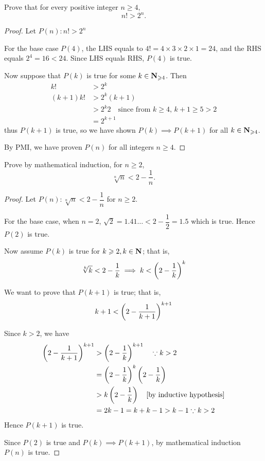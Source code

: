 \begin{prbm}
Prove that for every positive integer $n\ge4$,
\[ n!>2^n. \]
\end{prbm}

\begin{proof}
Let $P(n):n!>2^n$

For the base case $P(4)$, the LHS equals to $4!=4\times3\times2\times1=24$, and the RHS equals $2^4=16<24$. Since LHS equals RHS, $P(4)$ is true.

Now suppose that $P(k)$ is true for some $k\in\mathbf N_{\geqslant4}$. Then
\begin{align*}
k!&>2^k \\
(k+1)k!&>2^k(k+1)\\
&>2^k2\quad\text{since from $k\ge4$, $k+1\ge5>2$} \\
&=2^{k+1}
\end{align*}
thus $P(k+1)$ is true, so we have shown $P(k)\implies P(k+1)$ for all $k\in\mathbf N_{\geqslant4}$.

By PMI, we have proven $P(n)$ for all integers $n\ge4$.
\end{proof}

\begin{prbm}
Prove by mathematical induction, for $n\ge2$,
\[ \sqrt[n]{n}<2-\frac{1}{n}. \]
\end{prbm}

\begin{proof}
Let $P(n):\sqrt[n]{n}<2 - \dfrac{1}{n}$ for $n \ge 2$.

For the base case, when $n=2$, $\sqrt{2}=1.41\dots<2-\dfrac{1}{2}=1.5$ which is true. Hence $P(2)$ is true.

Now assume $P(k)$ is true for $k \geqslant 2, k \in \mathbf N$; that is,
\[ \sqrt[k]{k}<2 - \dfrac{1}{k} \implies k<\left(2-\frac{1}{k}\right)^k \]

We want to prove that $P(k+1)$ is true; that is,
\[ k+1<\left(2-\frac{1}{k+1}\right)^{k+1} \]

Since $k>2$, we have 
\begin{align*}
\left(2-\frac{1}{k+1}\right)^{k+1}
&> \left(2-\frac{1}{k}\right)^{k+1} \quad \because k>2 \\
&= \left(2-\frac{1}{k}\right)^k\left(2-\frac{1}{k}\right) \\
&> k\left(2-\frac{1}{k}\right) \quad \text{[by inductive hypothesis]} \\
&= 2k-1=k+k-1 > k-1 \because k>2
\end{align*}
Hence $P(k+1)$ is true.

Since $P(2)$ is true and $P(k)\implies P(k+1)$, by mathematical induction $P(n)$ is true.
\end{proof}

